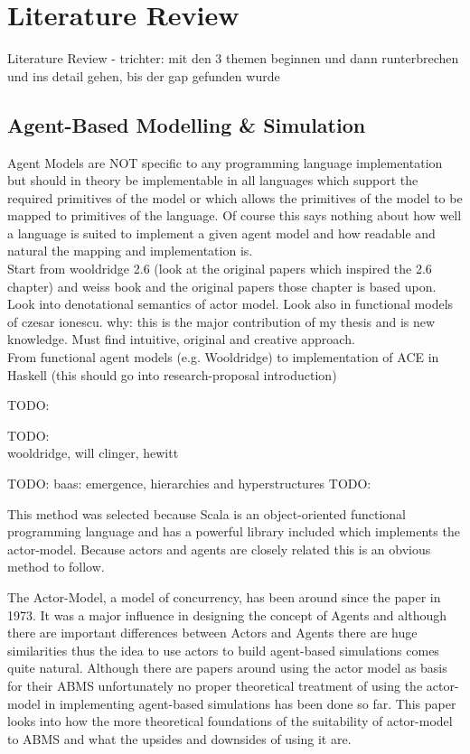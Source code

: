 \section{Literature Review}
Literature Review
- trichter: mit den 3 themen beginnen und dann runterbrechen und ins detail gehen, bis der gap gefunden wurde

\subsection{Agent-Based Modelling \& Simulation}
Agent Models are NOT specific to any programming language implementation but should in theory be implementable in all languages which support the required primitives of the model or which allows the primitives of the model to be mapped to primitives of the language. Of course this says nothing about how well a language is suited to implement a given agent model and how readable and natural the mapping and implementation is. \\

Start from wooldridge 2.6 (look at the original papers which inspired the 2.6 chapter) and weiss book and the original papers those chapter is based upon. Look into denotational semantics of actor model. Look also in functional models of czesar ionescu. why: this is the major contribution of my thesis and is new knowledge. Must find intuitive, original and creative approach. \\
From functional agent models (e.g. Wooldridge) to implementation of ACE in Haskell (this should go into research-proposal introduction)

TODO: \cite{Genesereth1987}

TODO: \cite{Muller1997}\\

 wooldridge,  will clinger, hewitt

TODO: baas: emergence, hierarchies and hyperstructures
TODO: \cite{baas_emergence_1997}

This method was selected because Scala is an object-oriented functional programming language and has a powerful library included which implements the actor-model. Because actors and agents are closely related this is an obvious method to follow.


The Actor-Model, a model of concurrency, has been around since the paper \cite{Hewitt_1973} in 1973. It was a major influence in designing the concept of Agents and although there are important differences between Actors and Agents there are huge similarities thus the idea to use actors to build agent-based simulations comes quite natural. Although there are papers around using the actor model as basis for their ABMS unfortunately no proper theoretical treatment of using the actor-model in implementing agent-based simulations has been done so far. This paper looks into how the more theoretical foundations of the suitability of actor-model to ABMS and what the upsides and downsides of using it are.

